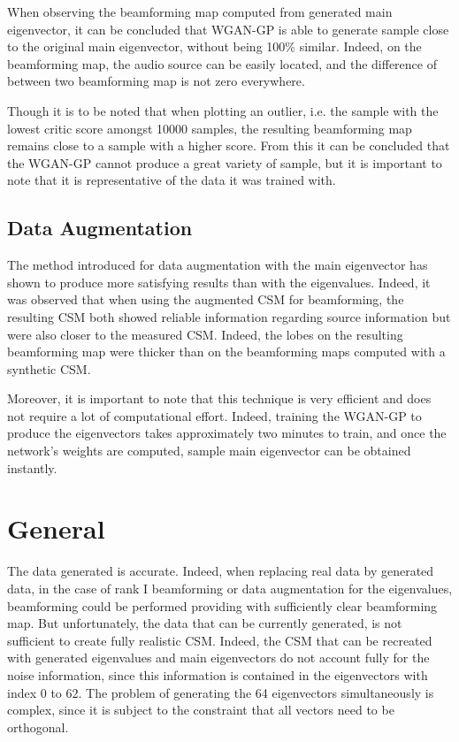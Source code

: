 \documentclass[11pt,a4paper,twoside]{report}
\begin{document}
When observing the beamforming map computed from generated main eigenvector, it can be concluded that WGAN-GP is able to generate sample close to the original main eigenvector, without being 100\% similar. Indeed, on the beamforming map, the audio source can be easily located, and the difference of between two beamforming map is not zero everywhere.

Though it is to be noted that when plotting an outlier, i.e. the sample with the lowest critic score amongst 10000 samples, the resulting beamforming map remains close to a sample with a higher score. From this it can be concluded that the WGAN-GP cannot produce a great variety of sample, but it is important to note that it is representative of the data it was trained with.  

\subsection{Data Augmentation}

The method introduced for data augmentation with the main eigenvector has shown to produce more satisfying results than with the eigenvalues. Indeed, it was observed that when using the augmented CSM for beamforming, the resulting CSM both showed reliable information regarding source information but were also closer to the measured CSM. Indeed, the lobes on the resulting beamforming map were thicker than on the beamforming maps computed with a synthetic CSM.

Moreover, it is important to note that  this technique is very efficient and does not require a lot of computational effort. Indeed, training the WGAN-GP to produce  the eigenvectors takes approximately two minutes to train, and once the network's weights are computed, sample main eigenvector can be obtained instantly.

\section{General}

The data generated is accurate. Indeed, when replacing real data by generated data, in the case of rank I beamforming or data augmentation for the eigenvalues, beamforming could be performed providing with sufficiently clear beamforming map. But unfortunately, the data that can be currently generated, is not sufficient to create fully realistic CSM. Indeed, the CSM that can be recreated with generated eigenvalues and main eigenvectors do not account fully for the noise information, since this information is contained in the eigenvectors with index $0$ to $62$. The problem of generating the 64 eigenvectors simultaneously is complex, since it is subject to the constraint that all vectors need to be orthogonal. 
\end{document}
